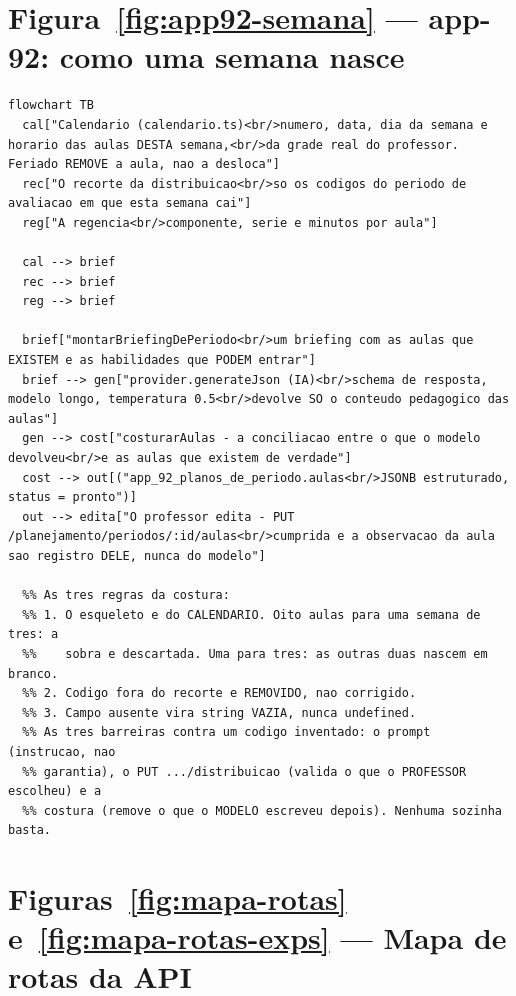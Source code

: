 \section{Figura~\ref{fig:app92-semana} --- app-92: como uma semana nasce}

\begin{lstlisting}[language=mermaid]
flowchart TB
  cal["Calendario (calendario.ts)<br/>numero, data, dia da semana e horario das aulas DESTA semana,<br/>da grade real do professor. Feriado REMOVE a aula, nao a desloca"]
  rec["O recorte da distribuicao<br/>so os codigos do periodo de avaliacao em que esta semana cai"]
  reg["A regencia<br/>componente, serie e minutos por aula"]

  cal --> brief
  rec --> brief
  reg --> brief

  brief["montarBriefingDePeriodo<br/>um briefing com as aulas que EXISTEM e as habilidades que PODEM entrar"]
  brief --> gen["provider.generateJson (IA)<br/>schema de resposta, modelo longo, temperatura 0.5<br/>devolve SO o conteudo pedagogico das aulas"]
  gen --> cost["costurarAulas - a conciliacao entre o que o modelo devolveu<br/>e as aulas que existem de verdade"]
  cost --> out[("app_92_planos_de_periodo.aulas<br/>JSONB estruturado, status = pronto")]
  out --> edita["O professor edita - PUT /planejamento/periodos/:id/aulas<br/>cumprida e a observacao da aula sao registro DELE, nunca do modelo"]

  %% As tres regras da costura:
  %% 1. O esqueleto e do CALENDARIO. Oito aulas para uma semana de tres: a
  %%    sobra e descartada. Uma para tres: as outras duas nascem em branco.
  %% 2. Codigo fora do recorte e REMOVIDO, nao corrigido.
  %% 3. Campo ausente vira string VAZIA, nunca undefined.
  %% As tres barreiras contra um codigo inventado: o prompt (instrucao, nao
  %% garantia), o PUT .../distribuicao (valida o que o PROFESSOR escolheu) e a
  %% costura (remove o que o MODELO escreveu depois). Nenhuma sozinha basta.
\end{lstlisting}

\section{Figuras~\ref{fig:mapa-rotas} e~\ref{fig:mapa-rotas-exps} --- Mapa de rotas da API}

